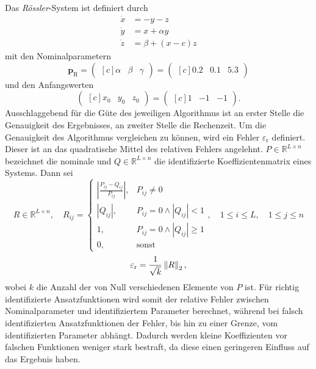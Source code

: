 Das \textit{Rössler}-System ist definiert durch
\begin{equation}
\begin{aligned}
\dot{x} &= -y-z\\
\dot{y} &= x+\alpha y\\
\dot{z} &= \beta + (x-c)z
\end{aligned}
\end{equation}
mit den Nominalparametern
\begin{equation}
\boldsymbol{p}_\text{R}=	\begin{pmatrix*}[c]
				\alpha&\beta&\gamma
				\end{pmatrix*} = 
				\begin{pmatrix*}[c]
					0.2& 0.1& 5.3
				\end{pmatrix*}
\end{equation}
und den Anfangswerten
\begin{equation}
\begin{pmatrix*}[c]
				x_0 & y_0 & z_0
				\end{pmatrix*} = 
				\begin{pmatrix*}[c]
				1& -1& -1
				\end{pmatrix*}.
\end{equation}
Ausschlaggebend für die Güte des jeweiligen Algorithmus ist an erster Stelle die Genauigkeit des Ergebnisses, an zweiter Stelle die Rechenzeit. Um die Genauigkeit des Algorithmus vergleichen zu können, wird ein Fehler $\varepsilon_\text{r}$  definiert. Dieser ist an das quadratische Mittel des relativen Fehlers angelehnt. $P\in\mathbb{R}^{L\times n}$ bezeichnet die nominale und $Q\in\mathbb{R}^{L\times n}$ die identifizierte Koeffizientenmatrix eines Systems. Dann sei
\begin{equation}
R \in\mathbb{R}^{L\times n} , \quad R_{ij}= \begin{cases}
|\frac{P_{ij}-Q_{ij}}{P_{ij}}|, & P_{ij} \neq 0\\
|Q_{ij}|, & P_{ij} = 0 \wedge |Q_{ij}| < 1\\
1, & P_{ij} = 0 \wedge |Q_{ij}| \geq 1\\
0, & \text{sonst}
\end{cases}, \quad  1 \leq i \leq L, \quad 1\leq j \leq n
\end{equation}
\begin{equation}
\varepsilon_\text{r} = \frac{1}{\sqrt{k}}\left\|R\right\|_2,
\end{equation} 
wobei $k$ die Anzahl der von Null verschiedenen Elemente von $P$ ist. Für richtig identifizierte Ansatzfunktionen wird somit der relative Fehler zwischen Nominalparameter und identifiziertem Parameter berechnet, während bei falsch identifizierten Ansatzfunktionen der Fehler, bis hin zu einer Grenze, vom identifizierten Parameter abhängt. Dadurch werden kleine Koeffizienten vor falschen Funktionen weniger stark bestraft, da diese einen geringeren Einfluss auf das Ergebnis haben.

